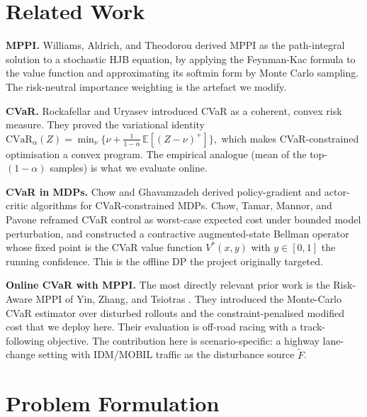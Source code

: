 \documentclass[letterpaper, 10 pt, conference]{ieeeconf}
\begin{document}
\section{Related Work}

\textbf{MPPI.} Williams, Aldrich, and Theodorou \cite{williams2017mppi} derived MPPI as the path-integral solution to a stochastic HJB equation, by applying the Feynman-Kac formula to the value function and approximating its softmin form by Monte Carlo sampling. The risk-neutral importance weighting is the artefact we modify.

\textbf{CVaR.} Rockafellar and Uryasev \cite{rockafellar2000cvar} introduced CVaR as a coherent, convex risk measure. They proved the variational identity
$
\mathrm{CVaR}_\alpha(Z) = \min_{\nu} \big\{\nu + \tfrac{1}{1-\alpha}\,\mathbb{E}[(Z - \nu)^+]\big\},
$
which makes CVaR-constrained optimisation a convex program. The empirical analogue (mean of the top-$(1{-}\alpha)$ samples) is what we evaluate online.

\textbf{CVaR in MDPs.} Chow and Ghavamzadeh \cite{chow2014cvar} derived policy-gradient and actor-critic algorithms for CVaR-constrained MDPs. Chow, Tamar, Mannor, and Pavone \cite{chow2015risk} reframed CVaR control as worst-case expected cost under bounded model perturbation, and constructed a contractive augmented-state Bellman operator whose fixed point is the CVaR value function $V^*(x, y)$ with $y \in [0,1]$ the running confidence. This is the offline DP the project originally targeted.

\textbf{Online CVaR with MPPI.} The most directly relevant prior work is the Risk-Aware MPPI of Yin, Zhang, and Tsiotras \cite{yin2022ra}. They introduced the Monte-Carlo CVaR estimator over disturbed rollouts and the constraint-penalised modified cost that we deploy here. Their evaluation is off-road racing with a track-following objective. The contribution here is scenario-specific: a highway lane-change setting with IDM/MOBIL traffic as the disturbance source $\tilde{F}$.

\section{Problem Formulation}
\label{sec:problem}
\end{document}
